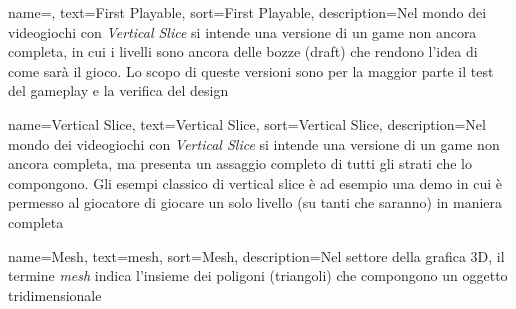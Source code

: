 {
	name=,
	text=First Playable,
	sort=First Playable,
	description={Nel mondo dei videogiochi con \emph{Vertical Slice} si intende una versione di un game non ancora completa, in cui i livelli sono ancora delle bozze (draft) che rendono l'idea di come sarà il gioco. Lo scopo di queste versioni sono per la maggior parte il test del gameplay e la verifica del design}
}

{
	name=Vertical Slice,
	text=Vertical Slice,
	sort=Vertical Slice,
	description={Nel mondo dei videogiochi con \emph{Vertical Slice} si intende una versione di un game non ancora completa, ma presenta un assaggio completo di tutti gli strati che lo compongono. Gli esempi classico di vertical slice è ad esempio una demo in cui è permesso al giocatore di giocare un solo livello (su tanti che saranno) in maniera completa}
}

{
	name=Mesh,
	text=mesh,
	sort=Mesh,
	description={Nel settore della grafica 3D, il termine \emph{mesh} indica l'insieme dei poligoni (triangoli) che compongono un oggetto tridimensionale}
}

